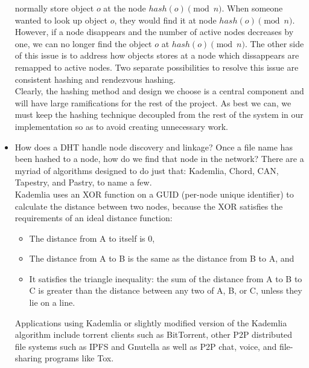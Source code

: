 \documentclass[12pt]{article}
\begin{document}
\begin{itemize}
            normally store object $o$ at the node $hash(o) \pmod n$.  When
            someone wanted to look up object $o$, they would find it at node
            $hash(o) \pmod n$.  However, if a node disappears and the number of
            active nodes decreases by one, we can no longer find the object $o$
            at $hash(o) \pmod n$.  The other side of this issue is to address how
            objects stores at a node which dissappears are remapped to active
            nodes.  Two separate possibilities to resolve this issue are
            consistent hashing and rendezvous hashing.\\
            Clearly, the hashing method and design we choose is a central
            component and will have large ramifications for the rest of the
            project.  As best we can, we must keep the hashing technique
            decoupled from the rest of the system in our implementation so as to
            avoid creating unnecessary work.

        \item How does a DHT handle node discovery and linkage? Once a file name
            has been hashed to a node, how do we find that node in the network?
            There are a myriad of algorithms designed to do just that:
            Kademlia\cite{kademlia}, Chord\cite{chord}, CAN,
            Tapestry\cite{tapestry}, and
            Pastry\cite{pastry}, to name a few.\\
            Kademlia uses an XOR function on a GUID (per-node unique identifier)
            to calculate the distance between two nodes, because the XOR
            satisfies the requirements of an ideal distance function:
            \begin{itemize}
                \item The distance from A to itself is 0,
                \item The distance from A to B is the same as the distance from
                    B to A, and
                \item It satisfies the triangle inequality: the sum of the
                    distance from A to B to C is greater than the distance
                    between any two of A, B, or C, unless they lie on a line.
            \end{itemize}
            Applications using Kademlia or slightly modified version of the
            Kademlia algorithm include torrent clients such as BitTorrent, other
            P2P distributed file systems such as IPFS and Gnutella as well as
            P2P chat, voice, and file-sharing programs like Tox.
    \end{itemize}
\end{document}
